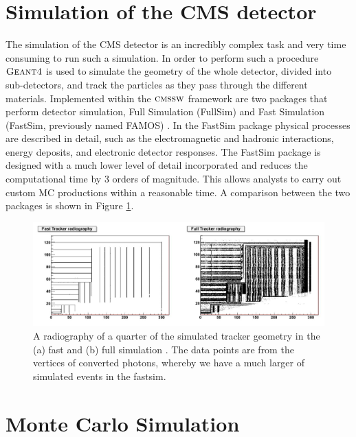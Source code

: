 \section{Simulation of the CMS detector}

The simulation of the CMS detector is an incredibly complex task and very time consuming to run such a simulation. In order to perform such a procedure ${\textsc{Geant4}}$ \cite{GEANT4} is used to simulate the geometry of the whole detector, divided into sub-detectors, and track the particles as they pass through the different materials. Implemented within the ${\textsc{cmssw}}$ framework are two packages that perform detector simulation, Full Simulation (FullSim) \cite{FullSim} and Fast Simulation (FastSim, previously named FAMOS) \cite{1742-6596-513-2-022012}.  
In the FastSim package physical processes are described in detail, such as the electromagnetic and hadronic interactions, energy deposits, and electronic detector responses. The FastSim package is designed with a much lower level of detail incorporated and reduces the computational time by 3 orders of magnitude. This allows analysts to carry out custom MC productions within a reasonable time. A comparison between the two packages is shown in Figure \ref{fig-FullSim}. 

\begin{figure} 
\begin{center}
\includegraphics[width=\textwidth]{Figures/FullSim.png}
\end{center}
\caption{A radiography of a quarter of the simulated tracker geometry in the (a) fast and (b) full simulation \cite{1742-6596-513-2-022012}. The data points are from the vertices of converted photons, whereby we have a much larger of simulated events in the fastsim.}
\label{fig-FullSim}
\end{figure}

\section{Monte Carlo Simulation}


